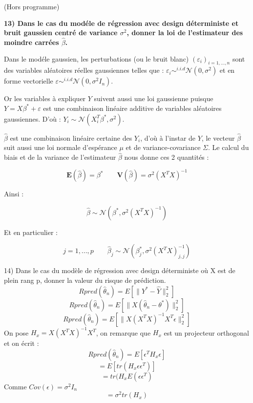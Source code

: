 (Hors programme)

\bigskip
\bigskip

\textbf{13) Dans le cas du mod\'ele de r\'egression avec design d\'eterministe et bruit gaussien centr\'e de variance $\sigma^2$, donner la loi de l'estimateur des moindre carr\'ees $\hat \beta$.}

\bigskip

Dans le mod\'ele gaussien, les perturbations (ou le bruit blanc) $(\varepsilon_i)_{i=1,...,n}$ sont des variables aléatoires réelles gaussiennes telles que : $ \varepsilon_i \sim^{i.i.d} \mathcal{N}(0,\sigma^2)$ et en forme vectorielle $ \varepsilon \sim^{i.i.d} \mathcal{N}(0,\sigma^2 I_n)$.

\bigskip

Or les variables à expliquer $Y$ suivent aussi une loi gaussienne puisque $Y = X\beta^{*} + \varepsilon$ est une combinaison linéaire additive de variables al\'eatoires gaussiennes. D'où : $Y_i \sim \mathcal{N}(X_i^T\beta^{*},\sigma^2)$.

\bigskip

$\hat \beta$ est une combinaison lin\'eaire certaine des $Y_i$, d'où à l'instar de $Y$, le vecteur $\hat \beta$ suit aussi une loi normale d'esp\'erance $\mu$ et de variance-covariance $\Sigma$. Le calcul du biais et de la variance de l'estimateur $\hat \beta$ nous donne ces 2 quantit\'es :

$$ \mathbf{E}(\hat \beta) = \beta^{*} \qquad \mathbf{V}(\hat \beta) = \sigma^2 (X^T X)^{-1}$$

Ainsi :

$$ \hat \beta \sim \mathcal{N}(\beta^{*},\sigma^2 (X^T X)^{-1}) $$

Et en particulier :

$$ j = 1,...,p \qquad \hat \beta_{j} \sim \mathcal{N}(\beta_j^{*},\sigma^2 (X^T X)^{-1}_{j,j}) $$

\bigskip
\bigskip







\vspace{5mm}

14) Dans le cas du modèle de régression avec design déterministe où X est de plein rang p, donner la valeur du risque de prédiction. \\

$$ Rpred(\hat{\theta}_n) = E\left[\| Y^* - \hat{Y} \|^2_2\right] $$
$$ Rpred(\hat{\theta}_n)  = E\left[\| X(\hat{\theta}_n - \theta^*) \|^2_2\right] $$
$$ Rpred(\hat{\theta}_n) = E \left[ \| X(X^TX)^{-1}X^T \epsilon \|^2_2 \right] $$
On pose $H_x = X(X^TX)^{-1}X^T$, on remarque que $H_x$ est un projecteur orthogonal et on écrit :
$$ Rpred(\hat{\theta}_n) = E\left[ \epsilon^TH_x\epsilon \right]$$
$$ = E\left[ tr(H_x \epsilon \epsilon^T)\right]$$
$$ = tr(H_x E(\epsilon\epsilon^T) $$ Comme $Cov(\epsilon) = \sigma^2 I_n$
$$ = \sigma^2 tr(H_x)$$

